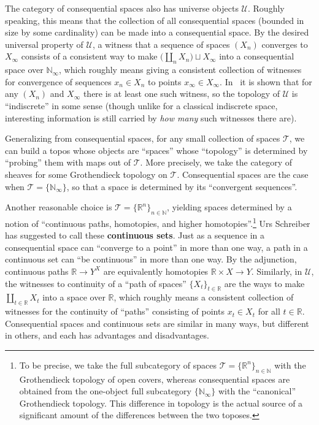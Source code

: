\documentclass[10pt]{article}
\def\oo{\ensuremath{\infty}}
\def\N{\mathbb{N}}
\def\R{\mathbb{R}}
\def\U{\mathscr{U}}
\def\T{\mathcal{T}}
\numberwithin{equation}{section}
\begin{document}
The category of consequential spaces also has universe objects $\U$.
Roughly speaking, this means that the collection of all consequential spaces (bounded in size by some cardinality) can be made into a consequential space.
By the desired universal property of $\U$, a witness that a sequence of spaces $(X_n)$ converges to $X_\oo$ consists of a consistent way to make $\big(\coprod_{n} X_n\big)\sqcup X_\oo$ into a consequential space over $\N_\oo$, which roughly means giving a consistent collection of witnesses for convergence of sequences $x_n \in X_n$ to points $x_\oo\in X_\oo$.
In~\cite{es:universe-indiscrete} it is shown that for any $(X_n)$ and $X_\oo$ there is at least one such witness, so the topology of $\U$ is ``indiscrete'' in some sense (though unlike for a classical indiscrete space, interesting information is still carried by \emph{how many} such witnesses there are).

Generalizing from consequential spaces, for any small collection of spaces $\T$, we can build a topos whose objects are ``spaces'' whose ``topology'' is determined by ``probing'' them with maps out of $\T$.
More precisely, we take the category of sheaves for some Grothendieck topology on $\T$.
Consequential spaces are the case when $\T = \{\N_\oo\}$, so that a space is determined by its ``convergent sequences''.

Another reasonable choice is $\T = \{\R^n\}_{n\in \N}$, yielding spaces determined by a notion of ``continuous paths, homotopies, and higher homotopies''.\footnote{To be precise, we take the full subcategory of spaces $\T = \{\R^n\}_{n\in \N}$ with the Grothendieck topology of open covers, whereas consequential spaces are obtained from the one-object full subcategory $\{\N_\oo\}$ with the ``canonical'' Grothendieck topology.
  This difference in topology is the actual source of a significant amount of the differences between the two toposes.}
Urs Schreiber has suggested to call these \textbf{continuous sets}.
Just as a sequence in a consequential space can ``converge to a point'' in more than one way, a path in a continuous set can ``be continuous'' in more than one way.
By the adjunction, continuous paths $\R \to Y^X$ are equivalently homotopies $\R\times X\to Y$.
Similarly, in $\U$, the witnesses to continuity of a ``path of spaces'' $\{X_t\}_{t\in\R}$ are the ways to make $\coprod_{t\in\R} X_t$ into a space over $\R$, which roughly means a consistent collection of witnesses for the continuity of ``paths'' consisting of points $x_t\in X_t$ for all $t\in \R$.
%
Consequential spaces and continuous sets are similar in many ways, but different in others, and each has advantages and disadvantages.
\end{document}
